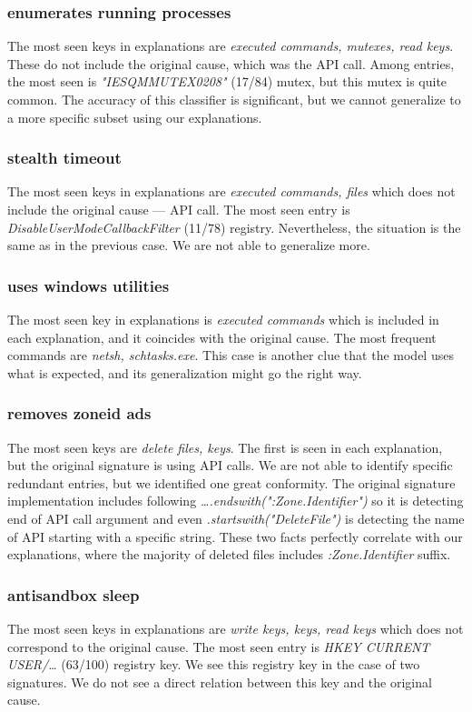 \subsubsection*{enumerates running processes}
The most seen keys in explanations are \emph{executed commands, mutexes, read keys}. These do not include the original cause, which was the API call.  Among entries, the most seen is \emph{"IESQMMUTEX0208"} (17/84) mutex, but this mutex is quite common. The accuracy of this classifier is significant, but we cannot generalize to a more specific subset using our explanations.

\subsubsection*{stealth timeout}
The most seen keys in explanations are \emph{executed commands, files} which does not include the original cause --- API call. The most seen entry is \emph{DisableUserModeCallbackFilter} (11/78) registry. Nevertheless, the situation is the same as in the previous case. We are not able to generalize more.

\subsubsection*{uses windows utilities}
The most seen key in explanations is \emph{executed commands} which is included in each explanation, and it coincides with the original cause. The most frequent commands are \emph{netsh, schtasks.exe}. This case is another clue that the model uses what is expected, and its generalization might go the right way.

\subsubsection*{removes zoneid ads}
The most seen keys are \emph{delete files, keys}. The first is seen in each explanation, but the original signature is using API calls. We are not able to identify specific redundant entries, but we identified one great conformity. The original signature implementation includes following \emph{\dots .endswith(":Zone.Identifier")} so it is detecting end of API call argument and even \emph{.startswith("DeleteFile")} is detecting the name of API starting with a specific string. These two facts perfectly correlate with our explanations, where the majority of deleted files includes \emph{:Zone.Identifier} suffix.

\subsubsection*{antisandbox sleep}
The most seen keys in explanations are \emph{write keys, keys, read keys} which does not correspond to the original cause. The most seen entry is \emph{HKEY CURRENT USER/\dots} (63/100) registry key. We see this registry key in the case of two signatures. We do not see a direct relation between this key and the original cause.

